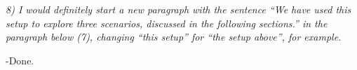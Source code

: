\documentclass[a4paper,10pt]{article}
\begin{document}
{\it    8) I would definitely start a new paragraph with the sentence ``We have
   used this setup to explore three scenarios, discussed in the following
   sections.'' in the paragraph below (7), changing ``this setup'' for ``the
   setup above'', for example.}
  
   -Done.
  
 


\section{}
\end{document}
